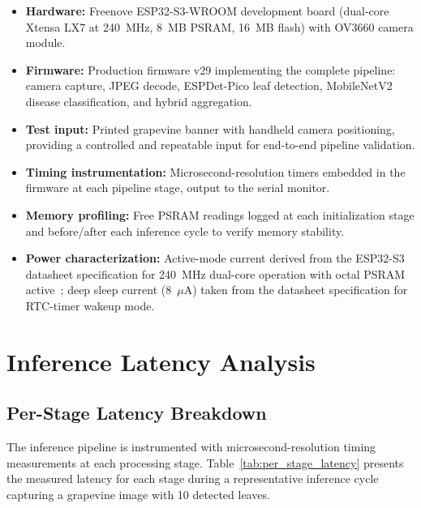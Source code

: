 \begin{itemize}
    \item \textbf{Hardware:} Freenove ESP32-S3-WROOM development board (dual-core Xtensa LX7 at 240~MHz, 8~MB PSRAM, 16~MB flash) with OV3660 camera module.
    \item \textbf{Firmware:} Production firmware v29 implementing the complete pipeline: camera capture, JPEG decode, ESPDet-Pico leaf detection, MobileNetV2 disease classification, and hybrid aggregation.
    \item \textbf{Test input:} Printed grapevine banner with handheld camera positioning, providing a controlled and repeatable input for end-to-end pipeline validation.
    \item \textbf{Timing instrumentation:} Microsecond-resolution timers embedded in the firmware at each pipeline stage, output to the serial monitor.
    \item \textbf{Memory profiling:} Free PSRAM readings logged at each initialization stage and before/after each inference cycle to verify memory stability.
    \item \textbf{Power characterization:} Active-mode current derived from the ESP32-S3 datasheet specification for 240~MHz dual-core operation with octal PSRAM active~\cite{esp32s3_datasheet}; deep sleep current (8~$\mu$A) taken from the datasheet specification for RTC-timer wakeup mode.
\end{itemize}


\section{Inference Latency Analysis}
\label{sec:latency_analysis}

\subsection*{Per-Stage Latency Breakdown}
\label{subsec:per_stage_latency}

The inference pipeline is instrumented with microsecond-resolution timing measurements at each processing stage. Table~\ref{tab:per_stage_latency} presents the measured latency for each stage during a representative inference cycle capturing a grapevine image with 10 detected leaves.

